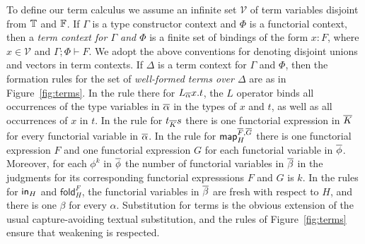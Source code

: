 \documentclass{lmcs}
\theoremstyle{plain}\newtheorem{satz}[thm]{Satz}
\newcommand{\fold}{\mathsf{fold}}
\newcommand{\cal}{\mathcal}
\newcommand{\map}{\mathsf{map}}
\begin{document}
To define our term calculus we assume an infinite set $\cal V$ of term
variables disjoint from $\mathbb{T}$ and $\mathbb{F}$. If $\Gamma$ is a type
constructor context and $\Phi$ is a functorial context, then a {\em
  term context for $\Gamma$ and $\Phi$} is a finite set of bindings of
the form $x : F$, where $x \in {\cal V}$ and $\Gamma; \Phi \vdash
F$. We adopt the above conventions for denoting disjoint unions and
vectors in term contexts. If $\Delta$ is a term context for $\Gamma$
and $\Phi$, then the formation rules for the set of {\em well-formed
  terms over $\Delta$} are as in Figure~\ref{fig:terms}. In the rule
there for $L_{\overline{\alpha}}x.t$, the $L$ operator binds all occurrences
of the type variables in $\overline{\alpha}$ in the types of $x$ and $t$, as
well as all occurrences of $x$ in $t$. In the rule for $t_{\overline{K}} s$
there is one functorial expression in $\overline{K}$ for every functorial
variable in $\overline{\alpha}$. In the rule for $\map^{\ol{F},\ol{G}}_H$
there is one functorial expression $F$ and one functorial expression
$G$ for each functorial variable in $\overline{\phi}$. Moreover, for each
$\phi^k$ in $\overline{\phi}$ the number of functorial variables in $\overline{\beta}$
in the judgments for its corresponding functorial expresssions $F$ and
$G$ is $k$. In the rules for $\mathsf{in}_H$ and $\fold^F_H$, the functorial
variables in $\overline{\beta}$ are fresh with respect to $H$, and there is
one $\beta$ for every $\alpha$. Substitution for terms is the obvious
extension of the usual capture-avoiding textual substitution, and the
rules of Figure~\ref{fig:terms} ensure that weakening is respected.
\end{document}
